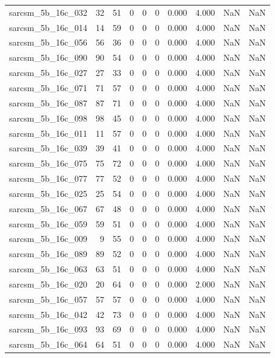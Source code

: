 \documentclass{article}
\begin{document}
\begin{longtable}{lrrrrrrrrr}
sarcsm\_5b\_16c\_032 & 32 & 51 & 0 & 0 & 0 & 0.000 & 4.000 & NaN & NaN \\
sarcsm\_5b\_16c\_014 & 14 & 59 & 0 & 0 & 0 & 0.000 & 4.000 & NaN & NaN \\
sarcsm\_5b\_16c\_056 & 56 & 36 & 0 & 0 & 0 & 0.000 & 4.000 & NaN & NaN \\
sarcsm\_5b\_16c\_090 & 90 & 54 & 0 & 0 & 0 & 0.000 & 4.000 & NaN & NaN \\
sarcsm\_5b\_16c\_027 & 27 & 33 & 0 & 0 & 0 & 0.000 & 4.000 & NaN & NaN \\
sarcsm\_5b\_16c\_071 & 71 & 57 & 0 & 0 & 0 & 0.000 & 4.000 & NaN & NaN \\
sarcsm\_5b\_16c\_087 & 87 & 71 & 0 & 0 & 0 & 0.000 & 4.000 & NaN & NaN \\
sarcsm\_5b\_16c\_098 & 98 & 45 & 0 & 0 & 0 & 0.000 & 4.000 & NaN & NaN \\
sarcsm\_5b\_16c\_011 & 11 & 57 & 0 & 0 & 0 & 0.000 & 4.000 & NaN & NaN \\
sarcsm\_5b\_16c\_039 & 39 & 41 & 0 & 0 & 0 & 0.000 & 4.000 & NaN & NaN \\
sarcsm\_5b\_16c\_075 & 75 & 72 & 0 & 0 & 0 & 0.000 & 4.000 & NaN & NaN \\
sarcsm\_5b\_16c\_077 & 77 & 52 & 0 & 0 & 0 & 0.000 & 4.000 & NaN & NaN \\
sarcsm\_5b\_16c\_025 & 25 & 54 & 0 & 0 & 0 & 0.000 & 4.000 & NaN & NaN \\
sarcsm\_5b\_16c\_067 & 67 & 48 & 0 & 0 & 0 & 0.000 & 4.000 & NaN & NaN \\
sarcsm\_5b\_16c\_059 & 59 & 51 & 0 & 0 & 0 & 0.000 & 4.000 & NaN & NaN \\
sarcsm\_5b\_16c\_009 & 9 & 55 & 0 & 0 & 0 & 0.000 & 4.000 & NaN & NaN \\
sarcsm\_5b\_16c\_089 & 89 & 52 & 0 & 0 & 0 & 0.000 & 4.000 & NaN & NaN \\
sarcsm\_5b\_16c\_063 & 63 & 51 & 0 & 0 & 0 & 0.000 & 4.000 & NaN & NaN \\
sarcsm\_5b\_16c\_020 & 20 & 64 & 0 & 0 & 0 & 0.000 & 2.000 & NaN & NaN \\
sarcsm\_5b\_16c\_057 & 57 & 57 & 0 & 0 & 0 & 0.000 & 4.000 & NaN & NaN \\
sarcsm\_5b\_16c\_042 & 42 & 73 & 0 & 0 & 0 & 0.000 & 4.000 & NaN & NaN \\
sarcsm\_5b\_16c\_093 & 93 & 69 & 0 & 0 & 0 & 0.000 & 4.000 & NaN & NaN \\
sarcsm\_5b\_16c\_064 & 64 & 51 & 0 & 0 & 0 & 0.000 & 4.000 & NaN & NaN \\

\end{longtable}
\end{document}
